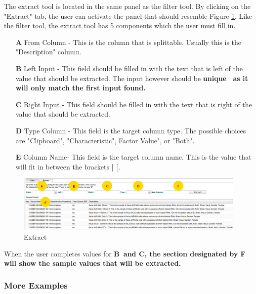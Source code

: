 \documentclass[a4paper]{article}
\begin{document}
\newpage
The extract tool is located in the same panel as the filter tool. By clicking on the "Extract" tab, the user can activate the panel that should resemble Figure \ref{extracttool}. Like the filter tool, the extract tool has 5 components which the user must fill in.



\begin{enumerate}
\item[\bf{A}] From Column - This is the column that is splittable. Usually this is the "Description" column.
\item[\bf{B}] Left Input -  This field should be filled in with the text that is left of the value that should be extracted. The input however should be \bf{unique}\rm~ as it will only match the first input found.
\item[\bf{C}] Right Input - This field should be filled in with the text that is right of the value that should be extracted.
\item[\bf{D}] Type Column - This field is the target column type. The possible choices are "Clipboard", "Characteristic", Factor Value", or "Both".
\item[\bf{E}] Column Name- This field is the target column name. This is the value that will fit in between the brackets [~].
\end{enumerate}

\begin{figure}[h]
\caption{Extract}
\centering
\label{extracttool}
\includegraphics[width=17cm]{images/Extract}
\end{figure}
When the user completes values for \bf{B}\rm ~and \bf{C}\rm , the section designated by \bf{F}\rm~ will show the sample values that will be extracted. 

\subsubsection*{More Examples}
\end{document}
